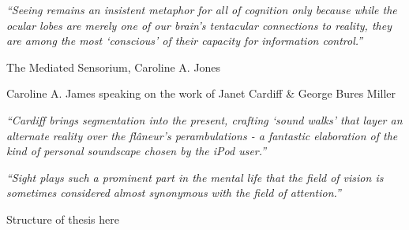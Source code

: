 \textit{``Seeing remains an insistent metaphor for all of cognition only because while the ocular lobes are merely one of our brain's tentacular connections to reality, they are among the most `conscious' of their capacity for information control.''}

The Mediated Sensorium, Caroline A. Jones



Caroline A. James speaking on the work of Janet Cardiff \& George Bures Miller

\textit{``Cardiff brings segmentation into the present, crafting `sound walks' that layer an alternate reality over the fl\^aneur's perambulations - a fantastic elaboration of the kind of personal soundscape chosen by the iPod user.''}


\textit{``Sight plays such a prominent part in the mental life that the field of vision is sometimes considered almost synonymous with the field of attention.''}~\cite{Lucas1951}


Structure of thesis here